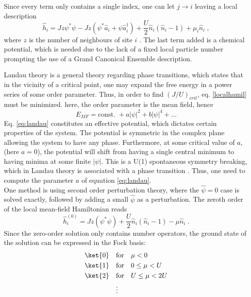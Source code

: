 Since every term only contains a single index, one can let $j \rightarrow i$ leaving a local description
\begin{equation}
	\hat{h}_i = J z \psi^* \psi - J z \left( \psi^* \hat{a}_i + \psi \hat{a}_{i}^{\dag} \right) + \frac{U}{2} \hat{n}_i \left( \hat{n}_i -1 \right) + \mu_i \hat{n}_i \; ,
	\label{localhamil}
\end{equation}
where $z$ is the number of neighbours of site $i$ \cite{vanoosten}. The last term added is a chemical potential, which is needed due to the lack of a fixed local particle number prompting the use of a Grand Canonical Ensemble description.

Landau theory is a general theory regarding phase transitions, which states that in the vicinity of a critical point, one may expand the free energy in a power series of some order parameter. Thus, in order to find $(J/U)_{crit}$, eq. \eqref{localhamil} must be minimized. here, the order parameter is the mean field, hence
\begin{equation}
	E_{MF} = \text{const. } + a |\psi|^2 + b |\psi|^4 + \ldots \label{eq:landau}
\end{equation} 
Eq. \eqref{eq:landau} constitutes an effective potential, which dictates certain properties of the system.
The potential is symmetric in the complex plane allowing the system to have any phase. Furthermore, at some critical value of $a$, (here $a = 0$), the potential will shift from having a single central minimum to having minima at some finite $|\psi|$. This is a U(1) spontaneous symmetry breaking, which in Landau theory is associated with a phase transition \cite{plischke}. Thus, one need to compute the parameter $a$ of equation \eqref{eq:landau}.\\
One method is using second order perturbation theory, where the $\hat{\psi} = 0$ case is solved exactly, followed by adding a small $\hat{\psi}$ as a perturbation. The zeroth order of the local mean-field Hamiltonian reads
\begin{equation}
	\hat{h}_{i}^{(0)} = J z \left( \psi^* \psi \right) + \frac{U}{2} \hat{n}_i \left( \hat{n}_i -1 \right) - \mu \hat{n}_i \; .
\end{equation} 
Since the zero-order solution only contains number operators, the ground state of the solution can be expressed in the Fock basis:
\begin{align*}
	\ket{0} \quad &\text{for} \quad \mu < 0 \\
	\ket{1} \quad &\text{for} \quad 0 \leq \mu < U \\
	\ket{2} \quad &\text{for} \quad U \leq \mu < 2 U \\
	& \vdots
\end{align*} 
